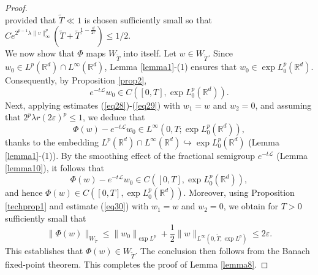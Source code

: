 \documentclass[a4paper,11pt]{amsart}
\numberwithin{equation}{section}
\theoremstyle{plain}
\theoremstyle{definition}
\begin{document}
\begin{proof}
\begin{equation}
\end{equation}
provided that $\widetilde{T}\ll1$ is chosen sufficiently small so that $Ce^{2^{p-1}\lambda\|v\|_\infty^p}\left(\widetilde{T}+\widetilde{T}^{1-\frac{d}{2 r}}\right)\leq 1/2$.\\
We now show that $\Phi$ maps $W_{\widetilde{T}}$ into itself. Let $w\in W_{\widetilde{T}}$. Since $w_0\in L^p(\mathbb{R}^d)\cap L^\infty(\mathbb{R}^d)$, Lemma \ref{lemma1}-(1) ensures that $w_0\in\exp L^p_0(\mathbb{R}^d)$. Consequently, by Proposition \ref{prop2}, 
$$e^{-t\mathcal{L}}w_0\in C([0,T],\exp L^p_0(\mathbb{R}^d)).$$ 
Next, applying estimates (\ref{eq28})-(\ref{eq29}) with $w_1=w$ and $w_2=0$, and assuming that $2^p\lambda r (2\varepsilon)^p\leq1$, we deduce that
$$\Phi(w)-e^{-t\mathcal{L}}w_0\in L^\infty(0,T;\exp L^p_0(\mathbb{R}^d)),$$
thanks to the embedding $L^p(\mathbb{R}^d)\cap L^\infty(\mathbb{R}^d)\hookrightarrow \exp L^p_0(\mathbb{R}^d)$ (Lemma \ref{lemma1}-(1)). By the smoothing effect of the fractional semigroup $e^{-t\mathcal{L}}$ (Lemma \ref{lemma10}), it follows that 
$$\Phi(w)-e^{-t\mathcal{L}}w_0\in C([0,T],\exp L^p_0(\mathbb{R}^d)),$$
and hence $\Phi(w)\in C([0,T],\exp L^p_0(\mathbb{R}^d))$.  Moreover, using Proposition \ref{techprop1} and estimate (\ref{eq30}) with $w_1=w$ and $w_2=0$, we obtain for $T>0$ sufficiently small that 
$$\|\Phi(w)\|_{W_{\widetilde{T}}}\leq \|w_0\|_{\exp L^p} +\frac{1}{2}\|w\|_{L^\infty(0,\widetilde{T};\exp L^p)}\leq 2\varepsilon.$$
This establishes that $\Phi(w)\in W_{\widetilde{T}}$. The conclusion then follows from the Banach fixed-point theorem. This completes the proof of Lemma \ref{lemma8}.
\end{proof}
\end{document}
